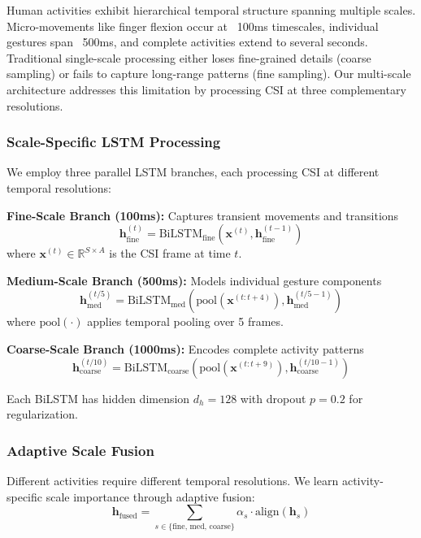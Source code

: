 \documentclass[10pt,journal,compsoc]{IEEEtran}
\begin{document}
Human activities exhibit hierarchical temporal structure spanning multiple scales. Micro-movements like finger flexion occur at ~100ms timescales, individual gestures span ~500ms, and complete activities extend to several seconds. Traditional single-scale processing either loses fine-grained details (coarse sampling) or fails to capture long-range patterns (fine sampling). Our multi-scale architecture addresses this limitation by processing CSI at three complementary resolutions.

\subsubsection{Scale-Specific LSTM Processing}

We employ three parallel LSTM branches, each processing CSI at different temporal resolutions:

\textbf{Fine-Scale Branch (100ms):} Captures transient movements and transitions
\begin{equation}
\mathbf{h}_{\text{fine}}^{(t)} = \text{BiLSTM}_{\text{fine}}(\mathbf{x}^{(t)}, \mathbf{h}_{\text{fine}}^{(t-1)})
\end{equation}
where $\mathbf{x}^{(t)} \in \mathbb{R}^{S \times A}$ is the CSI frame at time $t$.

\textbf{Medium-Scale Branch (500ms):} Models individual gesture components
\begin{equation}
\mathbf{h}_{\text{med}}^{(t/5)} = \text{BiLSTM}_{\text{med}}(\text{pool}(\mathbf{x}^{(t:t+4)}), \mathbf{h}_{\text{med}}^{(t/5-1)})
\end{equation}
where $\text{pool}(\cdot)$ applies temporal pooling over 5 frames.

\textbf{Coarse-Scale Branch (1000ms):} Encodes complete activity patterns
\begin{equation}
\mathbf{h}_{\text{coarse}}^{(t/10)} = \text{BiLSTM}_{\text{coarse}}(\text{pool}(\mathbf{x}^{(t:t+9)}), \mathbf{h}_{\text{coarse}}^{(t/10-1)})
\end{equation}

Each BiLSTM has hidden dimension $d_h = 128$ with dropout $p = 0.2$ for regularization.

\subsubsection{Adaptive Scale Fusion}

Different activities require different temporal resolutions. We learn activity-specific scale importance through adaptive fusion:
\begin{equation}
\mathbf{h}_{\text{fused}} = \sum_{s \in \{\text{fine, med, coarse}\}} \alpha_s \cdot \text{align}(\mathbf{h}_s)
\end{equation}
\end{document}
